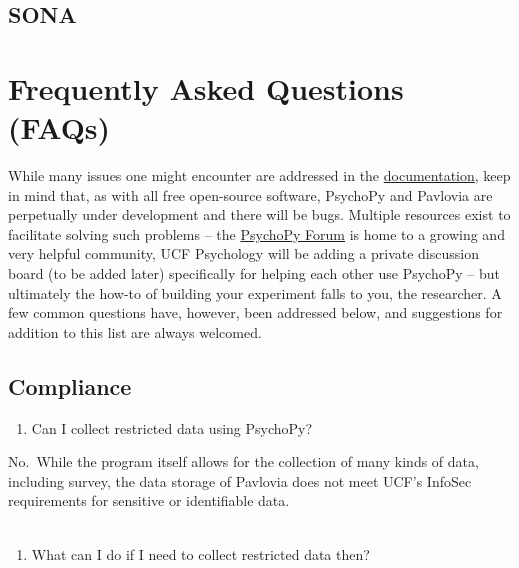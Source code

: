 \documentclass[
]{book}
\providecommand{\tightlist}{%
  \setlength{\itemsep}{0pt}\setlength{\parskip}{0pt}}
\begin{document}
\hypertarget{sona}{%
\subsection{SONA}\label{sona}}

\hypertarget{frequently-asked-questions-faqs}{%
\section{Frequently Asked Questions (FAQs)}\label{frequently-asked-questions-faqs}}

While many issues one might encounter are addressed in the \href{https://www.psychopy.org/documentation.html}{documentation}, keep in mind that, as with all free open-source software, PsychoPy and Pavlovia are perpetually under development and there will be bugs. Multiple resources exist to facilitate solving such problems -- the \href{https://discourse.psychopy.org/}{PsychoPy Forum} is home to a growing and very helpful community, UCF Psychology
will be adding a private discussion board (to be added later) specifically for helping each other use PsychoPy -- but ultimately the how-to of building your experiment falls to you, the researcher. A few common questions have, however, been addressed below, and suggestions for addition to this list are always welcomed.

\hypertarget{compliance}{%
\subsection{Compliance}\label{compliance}}

\begin{enumerate}
\def\labelenumi{(\arabic{enumi})}
\tightlist
\item
  Can I collect restricted data using PsychoPy?
\end{enumerate}

No.~While the program itself allows for the collection of many kinds of data, including survey, the data storage of Pavlovia does not meet UCF's InfoSec requirements for sensitive or identifiable data.\\
~\\

\begin{enumerate}
\def\labelenumi{(\arabic{enumi})}
\setcounter{enumi}{1}
\tightlist
\item
  What can I do if I need to collect restricted data then?
\end{enumerate}
\end{document}
